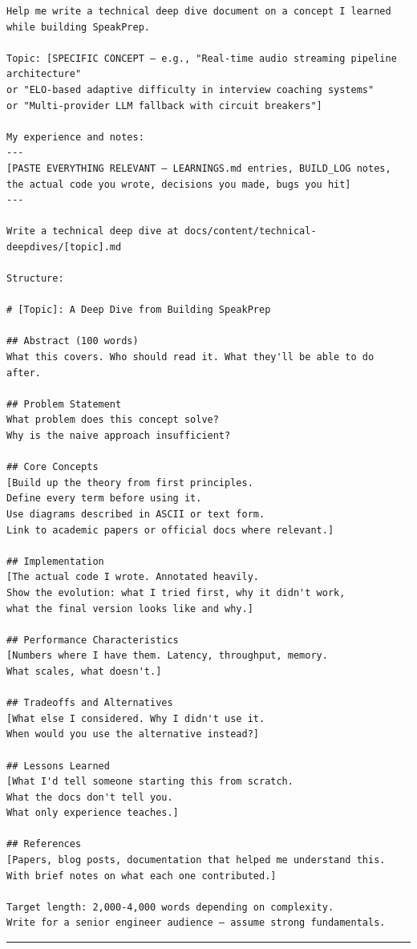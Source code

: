 \documentclass[
  11pt,
]{article}
\begin{document}
\begin{lstlisting}
Help me write a technical deep dive document on a concept I learned
while building SpeakPrep.

Topic: [SPECIFIC CONCEPT — e.g., "Real-time audio streaming pipeline architecture"
or "ELO-based adaptive difficulty in interview coaching systems"
or "Multi-provider LLM fallback with circuit breakers"]

My experience and notes:
---
[PASTE EVERYTHING RELEVANT — LEARNINGS.md entries, BUILD_LOG notes,
the actual code you wrote, decisions you made, bugs you hit]
---

Write a technical deep dive at docs/content/technical-deepdives/[topic].md

Structure:

# [Topic]: A Deep Dive from Building SpeakPrep

## Abstract (100 words)
What this covers. Who should read it. What they'll be able to do after.

## Problem Statement
What problem does this concept solve?
Why is the naive approach insufficient?

## Core Concepts
[Build up the theory from first principles.
Define every term before using it.
Use diagrams described in ASCII or text form.
Link to academic papers or official docs where relevant.]

## Implementation
[The actual code I wrote. Annotated heavily.
Show the evolution: what I tried first, why it didn't work,
what the final version looks like and why.]

## Performance Characteristics
[Numbers where I have them. Latency, throughput, memory.
What scales, what doesn't.]

## Tradeoffs and Alternatives
[What else I considered. Why I didn't use it.
When would you use the alternative instead?]

## Lessons Learned
[What I'd tell someone starting this from scratch.
What the docs don't tell you.
What only experience teaches.]

## References
[Papers, blog posts, documentation that helped me understand this.
With brief notes on what each one contributed.]

Target length: 2,000-4,000 words depending on complexity.
Write for a senior engineer audience — assume strong fundamentals.
\end{lstlisting}

\begin{center}\rule{0.5\linewidth}{0.5pt}\end{center}
\end{document}
